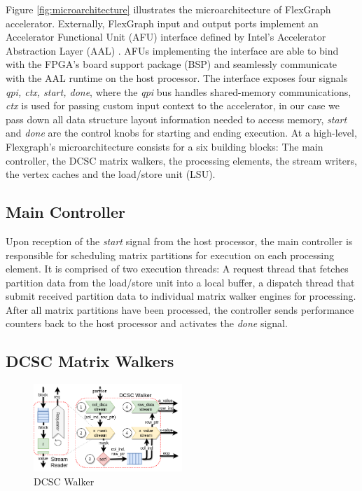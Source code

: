 Figure \ref{fig:microarchitecture} illustrates the microarchitecture of FlexGraph accelerator. Externally, FlexGraph input and output ports implement an Accelerator Functional Unit (AFU) interface defined by Intel's Accelerator Abstraction Layer (AAL) \cite{Intel-FPGA}. AFUs implementing the interface are able to bind with the FPGA's board support package (BSP) and seamlessly communicate with the AAL runtime on the host processor. The interface exposes four signals \textit{qpi, ctx, start, done}, where the \textit{qpi} bus handles shared-memory communications, \textit{ctx} is used for passing custom input context to the accelerator, in our case we pass down all data structure layout information needed to access memory, \textit{start} and \textit{done} are the control knobs for starting and ending execution. At a high-level, Flexgraph's
microarchitecture consists for a six building blocks: The main controller, the DCSC matrix walkers, the processing elements, the stream writers, the vertex caches and the load/store unit (LSU). 

\subsection{Main Controller}

Upon reception of the \textit{start} signal from the host processor, the main controller is responsible for scheduling matrix partitions for execution on each processing element. It is comprised of two execution threads: A request thread that fetches partition data from the load/store unit into a local buffer, a dispatch thread that submit received partition data to individual matrix walker engines for processing. After all matrix partitions have been processed, the controller sends performance counters back to the host processor and activates the \textit{done} signal.

\subsection{DCSC Matrix Walkers}

\begin{figure}[htbp]
\centering
\includegraphics[width=0.5\textwidth]{figures/micro_walker}
\caption{DCSC Walker}
\label{fig:micro_walker}
\end{figure}

